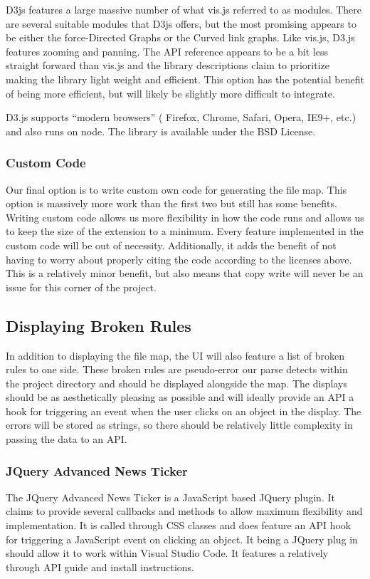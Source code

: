 \documentclass[letterpaper,10pt,titlepage,draftclsnofoot,onecolumn,onesided] {IEEEtran}
\begin{document}
D3js features a large massive number of what vis.js referred to as modules. 
There are several suitable modules that D3js offers, but the most promising appears to be either the force-Directed Graphs or the Curved link graphs. 
Like vis.js, D3.js features zooming and panning. 
The API reference appears to be a bit less straight forward than vis.js and the library descriptions claim to prioritize making the library light weight and efficient. 
This option has the potential benefit of being more efficient, but will likely be slightly more difficult to integrate.

D3.js supports ``modern browsers'' ( Firefox, Chrome, Safari, Opera, IE9+, etc.) and also runs on node. 
The library is available under the BSD License.


\subsubsection{Custom Code}
Our final option is to write custom own code for generating the file map. 
This option is massively more work than the first two but still has some benefits. 
Writing custom code allows us more flexibility in how the code runs and allows us to keep the size of the extension to a minimum. 
Every feature implemented in the custom code will be out of necessity. 
Additionally, it adds the benefit of not having to worry about properly citing the code according to the licenses above. 
This is a relatively minor benefit, but also means that copy write will never be an issue for this corner of the project.

\subsection{Displaying Broken Rules}
In addition to displaying the file map, the UI will also feature a list of broken rules to one side.
These broken rules are pseudo-error our parse detects within the project directory and should be displayed alongside the map. 
The displays should be as aesthetically pleasing as possible and will ideally provide an API a hook for triggering an event when the user clicks on an object in the display. 
The errors will be stored as strings, so there should be relatively little complexity in passing the data to an API. 

\subsubsection{JQuery Advanced News Ticker}
The JQuery Advanced News Ticker is a JavaScript based JQuery plugin. 
It claims to provide several callbacks and methods to allow maximum flexibility and implementation. 
It is called through CSS classes and does feature an API hook for triggering a JavaScript event on clicking an object. 
It being a JQuery plug in should allow it to work within Visual Studio Code. 
It features a relatively through API guide and install instructions.
\end{document}
